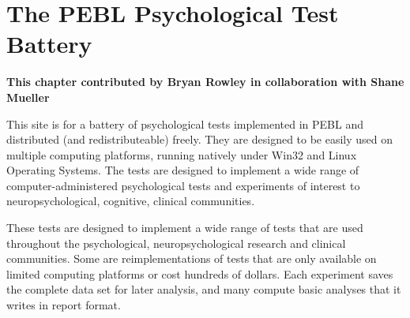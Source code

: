 \setlength{\skip\footins}{0.0469in}
\renewcommand\footnoterule{\vspace*{-0.0071in}\setlength\leftskip{0pt}\setlength\rightskip{0pt plus 1fil}\noindent\textcolor{black}{\rule{0.25\columnwidth}{0.0071in}}\vspace*{0.0398in}}
\chapter{The PEBL Psychological Test Battery}
\label{sec:testbattery} 
\textbf{This chapter contributed by Bryan Rowley in collaboration with Shane Mueller} 




This site is for a battery of psychological tests implemented in PEBL
and distributed (and redistributeable) freely. They are designed to be
easily used on multiple computing platforms, running natively under
Win32 and Linux Operating Systems. The tests are designed to
implement a wide range of computer-administered psychological tests and
experiments of interest to neuropsychological, cognitive, clinical
communities. 


These tests are designed to implement a wide range of tests that are
used throughout the psychological, neuropsychological research and
clinical communities. Some are reimplementations of tests that are only
available on limited computing platforms or cost hundreds of dollars.
Each experiment saves the complete data set for later analysis, and
many compute basic analyses that it writes in report format. 

